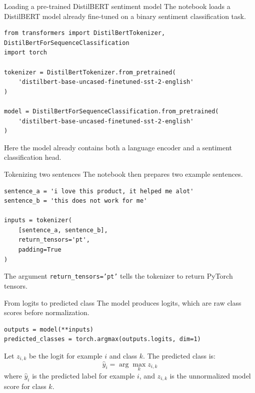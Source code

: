 \documentclass[aspectratio=169]{beamer}
\begin{document}
\begin{frame}[fragile]{Loading a pre-trained DistilBERT sentiment model}
The notebook loads a DistilBERT model already fine-tuned on a binary sentiment classification task.

\begin{lstlisting}[style=pythonstyle]
from transformers import DistilBertTokenizer, DistilBertForSequenceClassification
import torch

tokenizer = DistilBertTokenizer.from_pretrained(
    'distilbert-base-uncased-finetuned-sst-2-english'
)

model = DistilBertForSequenceClassification.from_pretrained(
    'distilbert-base-uncased-finetuned-sst-2-english'
)
\end{lstlisting}

\vspace{0.2cm}

Here the model already contains both a language encoder and a sentiment classification head.
\end{frame}

\begin{frame}[fragile]{Tokenizing two sentences}
The notebook then prepares two example sentences.

\begin{lstlisting}[style=pythonstyle]
sentence_a = 'i love this product, it helped me alot'
sentence_b = 'this does not work for me'

inputs = tokenizer(
    [sentence_a, sentence_b],
    return_tensors='pt',
    padding=True
)
\end{lstlisting}

\vspace{0.2cm}

The argument \texttt{return\_tensors='pt'} tells the tokenizer to return PyTorch tensors.
\end{frame}

\begin{frame}[fragile]{From logits to predicted class}
The model produces logits, which are raw class scores before normalization.

\begin{lstlisting}[style=pythonstyle]
outputs = model(**inputs)
predicted_classes = torch.argmax(outputs.logits, dim=1)
\end{lstlisting}

\vspace{0.3cm}

Let $z_{i,k}$ be the logit for example $i$ and class $k$. The predicted class is:
\[
\hat{y}_i = \arg\max_k z_{i,k}
\]
where $\hat{y}_i$ is the predicted label for example $i$, and $z_{i,k}$ is the unnormalized model score for class $k$.
\end{frame}
\end{document}
